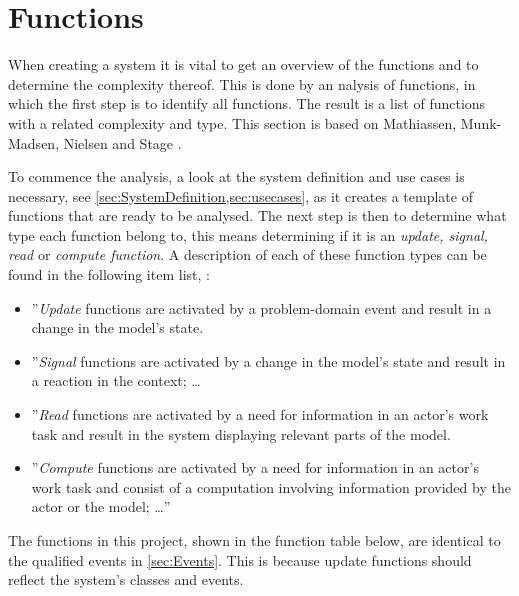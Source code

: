 \section{Functions} \label{sec:functions}
When creating a system it is vital to get an overview of the functions and to determine the complexity thereof.
This is done by an nalysis of functions, in which the first step is to identify all functions.
The result is a list of functions with a related complexity and type.
This section is based on Mathiassen, Munk-Madsen, Nielsen and Stage \citep[ch.~7]{Rod-Aalborg}.

To commence the analysis, a look at the system definition and use cases is necessary, see \cref{sec:SystemDefinition,sec:usecases}, as it creates a template of functions that are ready to be analysed.
The next step is then to determine what type each function belong to, this means determining if it is an \textit{update, signal, read} or \textit{compute function}.
A description of each of these function types can be found in the following item list, \citep[p.~140]{Rod-Aalborg}:

\begin{itemize}
	\item
	''\textit{Update} functions are  activated by a problem-domain event and result in a change in the model's state.
	\item
	''\textit{Signal} functions are activated by a change in the model's state and result in a reaction in the context; \ldots
	\item
	''\textit{Read} functions are activated by a need for information in an actor's work task and result in the system displaying relevant parts of the model.
	\item
	''\textit{Compute} functions are activated by a need for information in an actor's work task and consist of a computation involving information provided by the actor or the model; \ldots''
\end{itemize}

The functions in this project, shown in the function table below, are identical to the qualified events in \cref{sec:Events}.
This is because update functions should reflect the system's classes and events.

